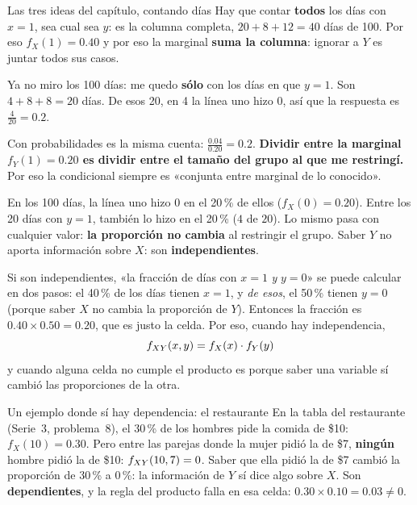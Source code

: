 \begin{afondo}{Las tres ideas del capítulo, contando días}
Hay que contar \textbf{todos} los días con $x=1$, sea cual sea $y$: es la columna completa,
$20+8+12=40$ días de 100. Por eso $f_X(1)=0.40$ y por eso la marginal \textbf{suma la columna}: ignorar a $Y$ es juntar todos
sus casos.

Ya no miro los 100 días: me quedo \textbf{sólo} con los días en que $y=1$. Son $4+8+8=20$ días. De esos 20, en 4 la línea uno
hizo 0, así que la respuesta es $\tfrac{4}{20}=0.2$.

Con probabilidades es la misma cuenta: $\tfrac{0.04}{0.20}=0.2$. \textbf{Dividir entre la marginal $f_Y(1)=0.20$ es dividir entre el
tamaño del grupo al que me restringí.} Por eso la condicional siempre es «conjunta entre marginal de lo conocido».

En los 100 días, la línea uno hizo 0 en el 20\,\% de ellos ($f_X(0)=0.20$). Entre los 20 días con $y=1$, también lo hizo
en el 20\,\% ($4$ de $20$). Lo mismo pasa con cualquier valor: \textbf{la proporción no cambia} al restringir el grupo. Saber $Y$
no aporta información sobre $X$: son \textbf{independientes}.

Si son independientes, «la fracción de días con $x=1$ \emph{y} $y=0$» se puede calcular en dos pasos:
el 40\,\% de los días tienen $x=1$, y \emph{de esos}, el 50\,\% tienen $y=0$ (porque saber $X$ no cambia la proporción de $Y$).
Entonces la fracción es $0.40\times0.50=0.20$, que es justo la celda. Por eso, cuando hay independencia,
\[f_{XY}(x,y)=f_X(x)\cdot f_Y(y)\]
y cuando alguna celda no cumple el producto es porque saber una variable sí cambió las proporciones de la otra.
\end{afondo}

\begin{afondo}{Un ejemplo donde sí hay dependencia: el restaurante}
En la tabla del restaurante (Serie~3, problema~8), el 30\,\% de los hombres pide la comida de \$10: $f_X(10)=0.30$.
Pero entre las parejas donde la mujer pidió la de \$7, \textbf{ningún} hombre pidió la de \$10: $f_{XY}(10,7)=0$.
Saber que ella pidió la de \$7 cambió la proporción de 30\,\% a 0\,\%: la información de $Y$ sí dice algo sobre $X$.
Son \textbf{dependientes}, y la regla del producto falla en esa celda: $0.30\times0.10=0.03\ne0$.
\end{afondo}
